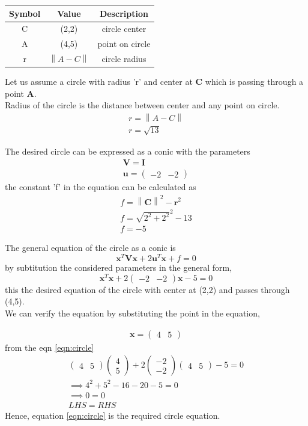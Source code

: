\documentclass[journal,12pt,twocolumn]{article}
\providecommand{\norm}[1]{\left\lVert#1\right\rVert}
\let\vec\mathbf
\newcommand{\myvec}[1]{\ensuremath{\begin{pmatrix}#1\end{pmatrix}}}
\let\vec\mathbf
\begin{document}
\begin{table}[h]
	\centering
\setlength\extrarowheight{2pt}
	\begin{tabular}{|c|c|c|}
		\hline
		\textbf{Symbol} & \textbf{Value} & \textbf{Description} \\
		\hline
		C & (2,2) & circle center\\
		\hline
		A & (4,5) & point on circle\\
		\hline
		r & $\norm{A-C}$ & circle radius\\
		\hline
	\end{tabular}
\end{table}
Let us assume a circle with radius 'r' and center at $\boldsymbol{C}$ which is passing through a point $\boldsymbol{A}$.\\
Radius of the circle is the distance between center and any point on circle.
\begin{align}
	r = \norm{A-C}\\
	r = \sqrt{13}
\end{align}

The desired circle can be expressed as a conic with the parameters
\begin{align}
	\vec{V} = \vec{I} \\
	\vec{u}= \myvec{-2 & -2} 
\end{align}
the constant 'f' in the equation can be calculated as
\begin{align}
	f = \norm{\vec{C}}^2 - \vec{r}^2 \\
	f = \sqrt{2^2 + 2^2}^2 - 13 \\
	f = -5
\end{align}

The general equation of the circle as a conic is
\begin{equation}
	\vec{x}^T\vec{V}\vec{x} + 2\vec{u}^T\vec{x} + f = 0
\end{equation}
by subtitution the considered parameters in the general form, 
\begin{equation}
	\vec{x}^T\vec{x} + 2\myvec{-2&-2}\vec{x} - 5 = 0
	\label{eqn:circle}
\end{equation}
this the desired equation of the circle with center at (2,2) and passes through (4,5).\\
We can verify the equation by substituting the point in the equation,

\begin{align}
	\vec{x} = \myvec{4 & 5}
\end{align}
from the eqn \ref{eqn:circle}
\begin{align}
	\myvec{4 & 5} \myvec{4\\5} + 2\myvec{-2\\-2}\myvec{4&5} -5 = 0\\
	\implies
	4^2 + 5 ^2 -16 -20 -5 =0 \\
	\implies
	0=0\\
	LHS = RHS
\end{align}
Hence, equation \ref{eqn:circle} is the required circle equation.
\end{document}
